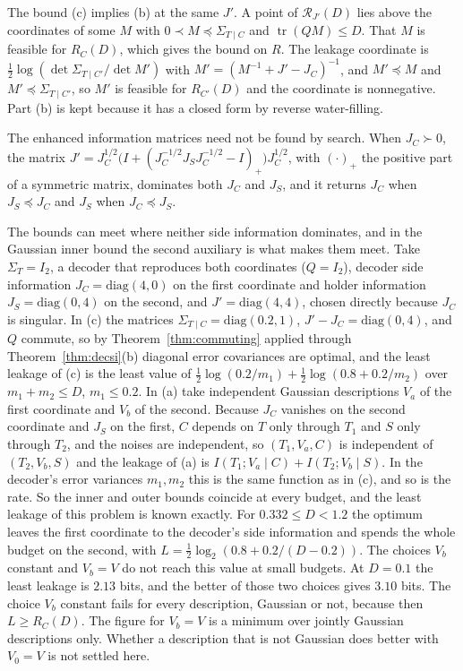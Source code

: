 \documentclass[11pt,onecolumn]{IEEEtran}
\newcommand{\tr}{\operatorname{tr}}
\newcommand{\RW}{\mathcal{R}}
\begin{document}
The bound (c) implies (b) at the same $J'$. A point of $\RW_{J'}(D)$
lies above the coordinates of some $M$ with
$0\prec M\preceq\Sigma_{T\mid C}$ and $\tr(QM)\le D$. That $M$ is feasible
for $R_C(D)$, which gives the bound on $R$. The leakage coordinate is
$\tfrac12\log(\det\Sigma_{T\mid C'}/\det M')$ with
$M'=(M^{-1}+J'-J_C)^{-1}$, and $M'\preceq M$ and
$M'\preceq\Sigma_{T\mid C'}$, so $M'$ is feasible for $R_{C'}(D)$ and the
coordinate is nonnegative. Part (b) is kept because it has a closed form
by reverse water-filling.

The enhanced information matrices need not be found by search. When
$J_C\succ0$, the matrix
$J'=J_C^{1/2}\bigl(I+(J_C^{-1/2}J_SJ_C^{-1/2}-I)_+\bigr)J_C^{1/2}$, with
$(\cdot)_+$ the positive part of a symmetric matrix, dominates both $J_C$
and $J_S$, and it returns $J_C$ when $J_S\preceq J_C$ and $J_S$ when
$J_C\preceq J_S$.

The bounds can meet where neither side information dominates, and in
the Gaussian inner bound the second auxiliary is what makes them meet. Take $\Sigma_T=I_2$, a decoder
that reproduces both coordinates ($Q=I_2$), decoder side information
$J_C=\mathrm{diag}(4,0)$ on the first coordinate and holder information
$J_S=\mathrm{diag}(0,4)$ on the second, and $J'=\mathrm{diag}(4,4)$,
chosen directly because $J_C$ is singular. In (c) the matrices
$\Sigma_{T\mid C}=\mathrm{diag}(0.2,1)$, $J'-J_C=\mathrm{diag}(0,4)$, and $Q$
commute, so by Theorem~\ref{thm:commuting} applied through
Theorem~\ref{thm:decsi}(b) diagonal error covariances are optimal, and the
least leakage of (c) is the least value of
$\tfrac12\log(0.2/m_1)+\tfrac12\log(0.8+0.2/m_2)$ over $m_1+m_2\le D$,
$m_1\le0.2$. In (a) take independent Gaussian descriptions $V_a$ of the
first coordinate and $V_b$ of the second. Because $J_C$ vanishes on the
second coordinate and $J_S$ on the first, $C$ depends on $T$ only through
$T_1$ and $S$ only through $T_2$, and the noises are independent, so
$(T_1,V_a,C)$ is independent of $(T_2,V_b,S)$ and the leakage of (a) is
$I(T_1;V_a\mid C)+I(T_2;V_b\mid S)$. In the decoder's error variances
$m_1,m_2$ this is the same function as in (c), and so is the rate. So the inner and outer bounds
coincide at every budget, and the least leakage of this problem is known
exactly. For $0.332\le D<1.2$ the optimum leaves the first coordinate to the
decoder's side information and spends the whole budget on the second,
with $L=\tfrac12\log_2(0.8+0.2/(D-0.2))$. The choices $V_b$ constant and
$V_b=V$ do not reach this value at small budgets. At $D=0.1$ the least
leakage is $2.13$ bits, and the better of those two choices gives
$3.10$ bits. The choice $V_b$ constant fails for every description,
Gaussian or not, because then $L\ge R_C(D)$. The figure for $V_b=V$ is a
minimum over jointly Gaussian descriptions only. Whether a description
that is not Gaussian does better with $V_0=V$ is not settled here.
\end{document}
